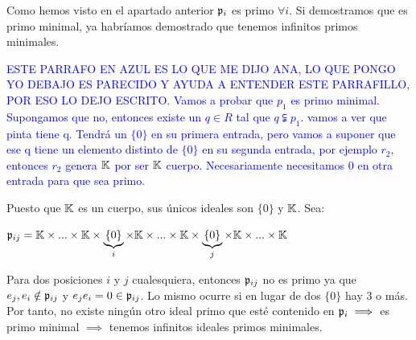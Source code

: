\begin{problem}[2]
	Como hemos visto en el apartado anterior $\mathfrak{p}_i$ es primo $\forall i$. Si demostramos que es primo minimal, ya habríamos demostrado que tenemos infinitos primos minimales.
	
	
	
	\textcolor{blue}{ESTE PARRAFO EN AZUL ES LO QUE ME DIJO ANA, LO QUE PONGO YO DEBAJO ES PARECIDO Y AYUDA A ENTENDER ESTE PARRAFILLO, POR ESO LO DEJO ESCRITO. Vamos a probar que $p_1$ es primo minimal. Supongamos que no, entonces existe un $q \in R$ tal que $q \subsetneqq p_1$. vamos a ver que pinta tiene q. Tendrá un $\{0\}$ en su primera entrada, pero vamos a suponer que ese q tiene un elemento distinto de $\{0\}$ en su segunda entrada, por ejemplo $r_2$, entonces $r_2$ genera $\mathbb{K}$ por ser $\mathbb{K}$ cuerpo. Necesariamente necesitamos 0 en otra entrada para que sea primo.} 

	Puesto que $\mathbb{K}$ es un cuerpo, sus únicos ideales son $\{0\}$ y $\mathbb{K}$. Sea:

	$\mathfrak{p}_{ij} =  \mathbb{K} \times ... \times \mathbb{K} \times \underbrace{\{0\}}_{i} \times \mathbb{K} \times ... \times \mathbb{K} \times \underbrace{\{0\}}_{j} \times \mathbb{K} \times ... \times \mathbb{K}$

	Para dos posiciones $i$ y $j$ cualesquiera, entonces $\mathfrak{p}_{ij}$ no es primo ya que $e_j, e_i \notin \mathfrak{p}_{ij}$ y $e_je_i=0 \in \mathfrak{p}_{ij}$. Lo mismo ocurre si en lugar de dos $\{0\}$ hay 3 o más. Por tanto, no existe ningún otro ideal primo que esté contenido en $\mathfrak{p}_i \implies$ es primo minimal $\implies$ tenemos infinitos ideales primos minimales.
\end{problem}

